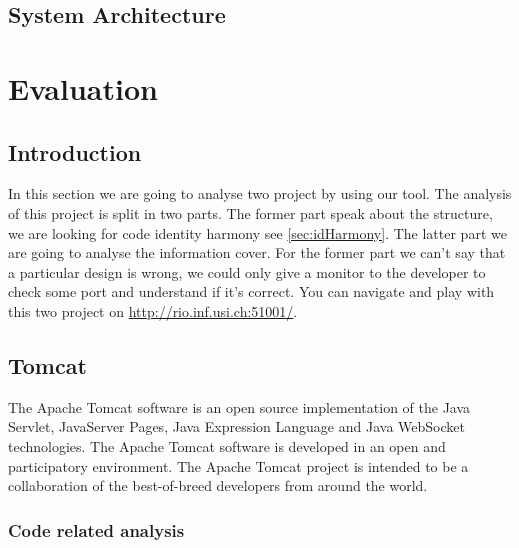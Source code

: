 \documentclass[]{usiinfbachelorproject}
\begin{document}
\subsection{System Architecture }

\newpage
\section{Evaluation} \label{evaluation}

\subsection{Introduction}
In this section we are going to analyse two project by using our tool. 
The analysis of this project is split in two parts. The former part speak about the structure, we are looking  for code identity harmony see \ref{sec:idHarmony}. The latter part we are going to analyse the information cover. 
For the former part we can't say that a particular design is wrong, we could only give a monitor to the developer to check some port and understand if it's correct.
You can navigate and play with this two project on \url{http://rio.inf.usi.ch:51001/}. 

\subsection{Tomcat}
The Apache Tomcat software is an open source implementation of the Java Servlet, JavaServer Pages, Java Expression Language and Java WebSocket technologies. 
The Apache Tomcat software is developed in an open and participatory environment. The Apache Tomcat project is intended to be a collaboration of the best-of-breed developers from around the world.

\subsubsection{Code related analysis}
\end{document}
